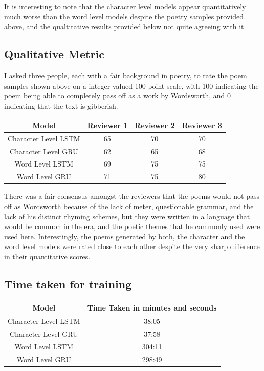 \documentclass[15pt]{article}
\begin{document}
It is interesting to note that the character level models appear quantitatively much worse than the word level models despite the poetry samples provided above, and the qualtitative results provided below not quite agreeing with it. 

\subsection*{Qualitative Metric}
I asked three people, each with a fair background in poetry, to rate the poem samples shown above on a integer-valued 100-point scale, with 100 indicating the poem being able to completely pass off as a work by Wordsworth, and 0 indicating that the text is gibberish.

\begin{center}
 \begin{tabular}{||c c c c||} 
 \hline
 Model & Reviewer 1 & Reviewer 2 & Reviewer 3 \\ [0.5ex] 
 \hline\hline
 Character Level LSTM & 65 & 70 & 70 \\ 
 \hline
 Character Level GRU & 62 & 65 & 68\\
 \hline
 Word Level LSTM & 69 & 75 & 75 \\
 \hline
 Word Level GRU & 71 & 75 & 80 \\ [1ex] 
 \hline
 \end{tabular}
\end{center}
There was a fair consensus amongst the reviewers that the poems would not pass off as Wordsworth because of the lack of meter, questionable grammar, and  the lack of his distinct rhyming schemes, but they were written in a language that would be common in the era, and the poetic themes that he commonly used were used here. Interestingly, the poems generated by both, the character and the word level models were rated close to each other despite the very sharp difference in their quantitative scores.

\subsection{Time taken for training}
\begin{center}
 \begin{tabular}{||c c||} 
 \hline
 Model & Time Taken in minutes and seconds \\ [0.5ex] 
 \hline\hline
 Character Level LSTM & 38:05 \\ 
 \hline
 Character Level GRU & 37:58\\
 \hline
 Word Level LSTM & 304:11 \\
 \hline
 Word Level GRU & 298:49 \\ [1ex] 
 \hline
 \end{tabular}
\end{center}
\end{document}
